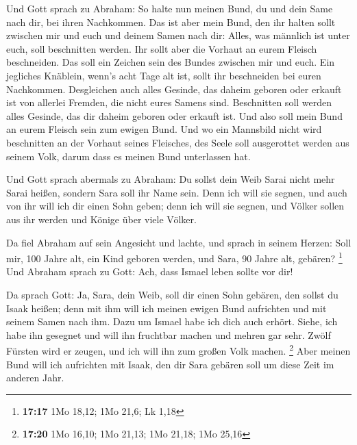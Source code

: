  Und Gott sprach zu Abraham: So halte nun meinen Bund, du
und dein Same nach dir, bei ihren Nachkommen.  Das ist aber
mein Bund, den ihr halten sollt zwischen mir und euch und deinem Samen
nach dir: Alles, was männlich ist unter euch, soll beschnitten werden.
 Ihr sollt aber die Vorhaut an eurem Fleisch beschneiden.
Das soll ein Zeichen sein des Bundes zwischen mir und euch.
 Ein jegliches Knäblein, wenn's acht Tage alt ist, sollt
ihr beschneiden bei euren Nachkommen. Desgleichen auch alles Gesinde,
das daheim geboren oder erkauft ist von allerlei Fremden, die nicht
eures Samens sind.  Beschnitten soll werden alles Gesinde,
das dir daheim geboren oder erkauft ist. Und also soll mein Bund an
eurem Fleisch sein zum ewigen Bund.  Und wo ein Mannsbild
nicht wird beschnitten an der Vorhaut seines Fleisches, des Seele soll
ausgerottet werden aus seinem Volk, darum dass es meinen Bund
unterlassen hat.

 Und Gott sprach abermals zu Abraham: Du sollst dein Weib
Sarai nicht mehr Sarai heißen, sondern Sara soll ihr Name sein.
 Denn ich will sie segnen, und auch von ihr will ich dir
einen Sohn geben; denn ich will sie segnen, und Völker sollen aus ihr
werden und Könige über viele Völker.

 Da fiel Abraham auf sein Angesicht und lachte, und sprach
in seinem Herzen: Soll mir, 100 Jahre alt, ein Kind geboren werden, und
Sara, 90 Jahre alt, gebären? \footnote{\textbf{17:17} 1Mo 18,12; 1Mo
  21,6; Lk 1,18}  Und Abraham sprach zu Gott: Ach, dass
Ismael leben sollte vor dir!

 Da sprach Gott: Ja, Sara, dein Weib, soll dir einen Sohn
gebären, den sollst du Isaak heißen; denn mit ihm will ich meinen ewigen
Bund aufrichten und mit seinem Samen nach ihm.  Dazu um
Ismael habe ich dich auch erhört. Siehe, ich habe ihn gesegnet und will
ihn fruchtbar machen und mehren gar sehr. Zwölf Fürsten wird er zeugen,
und ich will ihn zum großen Volk machen. \footnote{\textbf{17:20} 1Mo
  16,10; 1Mo 21,13; 1Mo 21,18; 1Mo 25,16}  Aber meinen Bund
will ich aufrichten mit Isaak, den dir Sara gebären soll um diese Zeit
im anderen Jahr.


